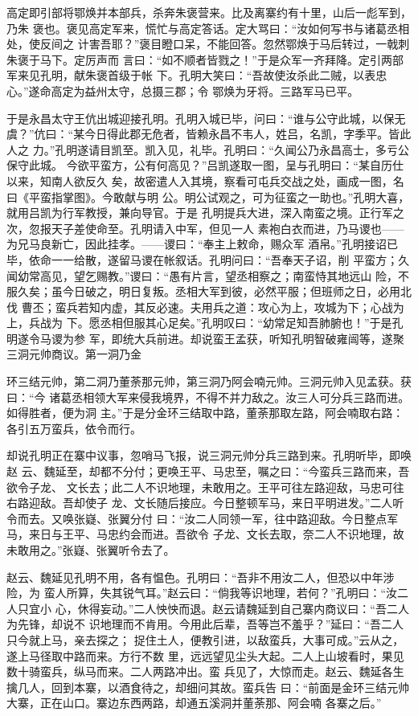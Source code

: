 高定即引部将鄂焕并本部兵，杀奔朱褒营来。比及离寨约有十里，山后一彪军到，乃朱
褒也。褒见高定军来，慌忙与高定答话。定大骂曰：“汝如何写书与诸葛丞相处，使反间之
计害吾耶？”褒目瞪口呆，不能回答。忽然鄂焕于马后转过，一戟刺朱褒于马下。定厉声而
言曰：“如不顺者皆戮之！”于是众军一齐拜降。定引两部军来见孔明，献朱褒首级于帐
下。孔明大笑曰：“吾故使汝杀此二贼，以表忠心。”遂命高定为益州太守，总摄三郡；令
鄂焕为牙将。三路军马已平。

于是永昌太守王伉出城迎接孔明。孔明入城已毕，问曰：“谁与公守此城，以保无
虞？”伉曰：“某今日得此郡无危者，皆赖永昌不韦人，姓吕，名凯，字季平。皆此人之
力。”孔明遂请目凯至。凯入见，礼毕。孔明曰：“久闻公乃永昌高士，多亏公保守此城。
今欲平蛮方，公有何高见？”吕凯遂取一图，呈与孔明曰：“某自历仕以来，知南人欲反久
矣，故密遣人入其境，察看可屯兵交战之处，画成一图，名曰《平蛮指掌图》。今敢献与明
公。明公试观之，可为征蛮之一助也。”孔明大喜，就用吕凯为行军教授，兼向导官。于是
孔明提兵大进，深入南蛮之境。正行军之次，忽报天子差使命至。孔明请入中军，但见一人
素袍白衣而进，乃马谡也——为兄马良新亡，因此挂孝。——谡曰：“奉主上敕命，赐众军
酒帛。”孔明接诏已毕，依命一一给散，遂留马谡在帐叙话。孔明问曰：“吾奉天子诏，削
平蛮方；久闻幼常高见，望乞赐教。”谡曰：“愚有片言，望丞相察之；南蛮恃其地远山
险，不服久矣；虽今日破之，明日复叛。丞相大军到彼，必然平服；但班师之日，必用北伐
曹丕；蛮兵若知内虚，其反必速。夫用兵之道：攻心为上，攻城为下；心战为上，兵战为
下。愿丞相但服其心足矣。”孔明叹曰：“幼常足知吾肺腑也！”于是孔明遂令马谡为参
军，即统大兵前进。却说蛮王孟获，听知孔明智破雍闿等，遂聚三洞元帅商议。第一洞乃金

环三结元帅，第二洞乃董荼那元帅，第三洞乃阿会喃元帅。三洞元帅入见孟获。获曰：“今
诸葛丞相领大军来侵我境界，不得不并力敌之。汝三人可分兵三路而进。如得胜者，便为洞
主。”于是分金环三结取中路，董荼那取左路，阿会喃取右路：各引五万蛮兵，依令而行。

却说孔明正在寨中议事，忽哨马飞报，说三洞元帅分兵三路到来。孔明听毕，即唤赵
云、魏延至，却都不分付；更唤王平、马忠至，嘱之曰：“今蛮兵三路而来，吾欲令子龙、
文长去；此二人不识地理，未敢用之。王平可往左路迎敌，马忠可往右路迎敌。吾却使子
龙、文长随后接应。今日整顿军马，来日平明进发。”二人听令而去。又唤张嶷、张翼分付
曰：“汝二人同领一军，往中路迎敌。今日整点军马，来日与王平、马忠约会而进。吾欲令
子龙、文长去取，奈二人不识地理，故未敢用之。”张嶷、张翼听令去了。

赵云、魏延见孔明不用，各有愠色。孔明曰：“吾非不用汝二人，但恐以中年涉险，为
蛮人所算，失其锐气耳。”赵云曰：“倘我等识地理，若何？”孔明曰：“汝二人只宜小
心，休得妄动。”二人怏怏而退。赵云请魏延到自己寨内商议曰：“吾二人为先锋，却说不
识地理而不肯用。今用此后辈，吾等岂不羞乎？”延曰：“吾二人只今就上马，亲去探之；
捉住土人，便教引进，以敌蛮兵，大事可成。”云从之，遂上马径取中路而来。方行不数
里，远远望见尘头大起。二人上山坡看时，果见数十骑蛮兵，纵马而来。二人两路冲出。蛮
兵见了，大惊而走。赵云、魏延各生擒几人，回到本寨，以酒食待之，却细问其故。蛮兵告
曰：“前面是金环三结元帅大寨，正在山口。寨边东西两路，却通五溪洞并董荼那、阿会喃
各寨之后。”

